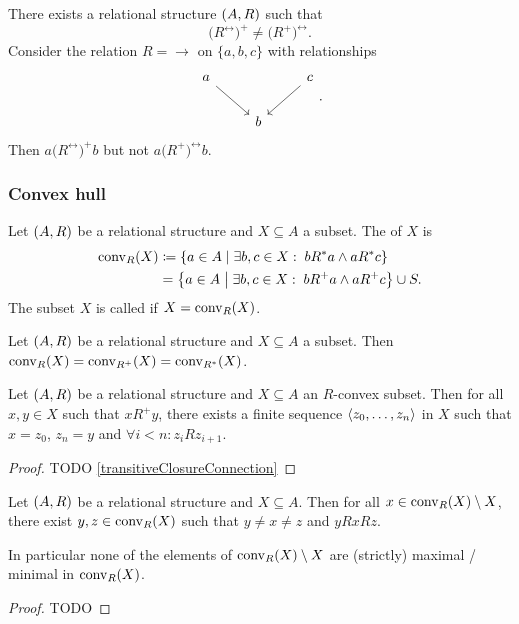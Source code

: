 \begin{example}
There exists a relational structure $\left( A,R \right)$ such that
\[ \big(R^\leftrightarrow\big)^+ \neq \big(R^+\big)^\leftrightarrow. \]
Consider the relation $R = \to$ on $\{a,b,c\}$ with relationships
\[ \begin{tikzcd}
a \ar[dr] & {} & \ar[dl] c \\
{} & b & {}
\end{tikzcd}. \]
Then $a \mathrel{\big(R^\leftrightarrow\big)^+}b$ but not $a \mathrel{\big(R^+\big)^\leftrightarrow}b$.
\end{example}



\subsubsection{Convex hull}
\begin{definition}
Let $\left( A,R \right)$ be a relational structure and $X\subseteq A$ a subset. The  of $X$ is
\begin{align*}
\operatorname{conv}_R(X) &\coloneqq \left\{ a\in A \;\middle|\; \exists b,c\in X:\; bR^*a \land aR^*c \right\} \\
&= \left\{ a\in A \;\middle|\; \exists b,c\in X:\; bR^+a \land aR^+c \right\} \cup S.
\end{align*}
The subset $X$ is called  if $X = \operatorname{conv}_R(X)$.
\end{definition}

\begin{lemma}
Let $\left( A,R \right)$ be a relational structure and $X\subseteq A$ a subset. Then $\operatorname{conv}_R(X) = \operatorname{conv}_{R^+}(X) = \operatorname{conv}_{R^*}(X)$.
\end{lemma}

\begin{lemma} \label{transitiveClosureConnectionInSet}
Let $\left( A,R \right)$ be a relational structure and $X\subseteq A$ an $R$-convex subset. Then for all $x,y\in X$ such that $x\mathrel{R^+}y$, there exists a finite sequence $\left\langle z_0, \ldots, z_n \right\rangle$ in $X$ such that $x = z_0$, $z_n = y$ and $\forall i<n: z_iRz_{i+1}$.
\end{lemma}
\begin{proof}
TODO \ref{transitiveClosureConnection}
\end{proof}

\begin{lemma} \label{addedElementsRConvexHull}
Let $\left( A,R \right)$ be a relational structure and $X\subseteq A$. Then for all $x\in \operatorname{conv}_R(X)\setminus X$, there exist $y,z\in \operatorname{conv}_R(X)$ such that $y\neq x\neq z$  and $yRxRz$.

In particular none of the elements of $\operatorname{conv}_R(X)\setminus X$ are (strictly) maximal / minimal in $\operatorname{conv}_R(X)$.
\end{lemma}
\begin{proof}
TODO
\end{proof}

